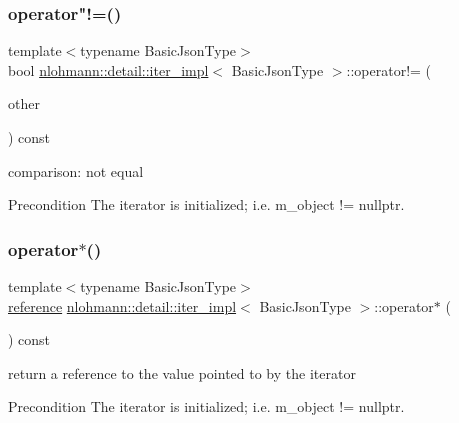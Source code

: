 \subsubsection{\texorpdfstring{operator"!=()}{operator!=()}}
{\footnotesize\ttfamily template$<$typename Basic\+Json\+Type$>$ \\
bool \hyperlink{classnlohmann_1_1detail_1_1iter__impl}{nlohmann\+::detail\+::iter\+\_\+impl}$<$ Basic\+Json\+Type $>$\+::operator!= (\begin{DoxyParamCaption}\item[{const \hyperlink{classnlohmann_1_1detail_1_1iter__impl}{iter\+\_\+impl}$<$ Basic\+Json\+Type $>$ \&}]{other }\end{DoxyParamCaption}) const\hspace{0.3cm}{\ttfamily [inline]}}



comparison\+: not equal 

\begin{DoxyPrecond}{Precondition}
The iterator is initialized; i.\+e. {\ttfamily m\+\_\+object != nullptr}. 
\end{DoxyPrecond}
\mbox{\label{classnlohmann_1_1detail_1_1iter__impl_a5ca57856d9bba54a5fc51cee891de827}} 
\subsubsection{\texorpdfstring{operator$\ast$()}{operator*()}}
{\footnotesize\ttfamily template$<$typename Basic\+Json\+Type$>$ \\
\hyperlink{classnlohmann_1_1detail_1_1iter__impl_a5be8001be099c6b82310f4d387b953ce}{reference} \hyperlink{classnlohmann_1_1detail_1_1iter__impl}{nlohmann\+::detail\+::iter\+\_\+impl}$<$ Basic\+Json\+Type $>$\+::operator$\ast$ (\begin{DoxyParamCaption}{ }\end{DoxyParamCaption}) const\hspace{0.3cm}{\ttfamily [inline]}}



return a reference to the value pointed to by the iterator 

\begin{DoxyPrecond}{Precondition}
The iterator is initialized; i.\+e. {\ttfamily m\+\_\+object != nullptr}. 
\end{DoxyPrecond}
\mbox{\label{classnlohmann_1_1detail_1_1iter__impl_a8ef76aeb5a5032768f0f61f48ac189c0}} 

